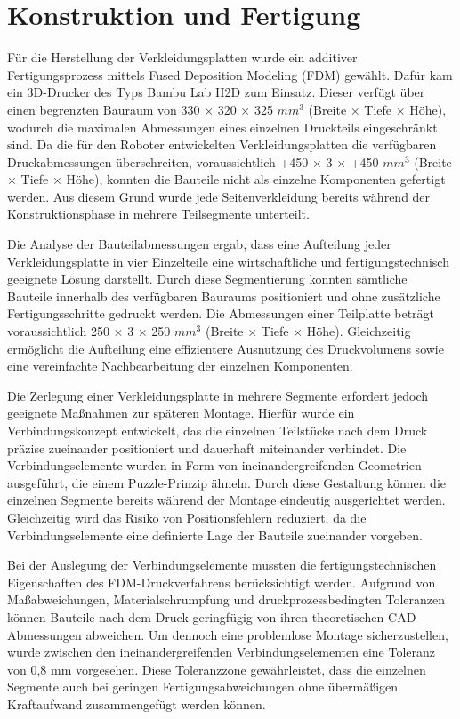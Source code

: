 \section{Konstruktion und Fertigung}

Für die Herstellung der Verkleidungsplatten wurde ein additiver Fertigungsprozess mittels Fused Deposition Modeling (FDM) gewählt. Dafür kam ein 3D-Drucker des Typs Bambu Lab H2D zum Einsatz. Dieser verfügt über einen begrenzten Bauraum von 330 × 320 × 325 $mm^3$ (Breite × Tiefe × Höhe), wodurch die maximalen Abmessungen eines einzelnen Druckteils eingeschränkt sind. Da die für den Roboter entwickelten Verkleidungsplatten die verfügbaren Druckabmessungen überschreiten, voraussichtlich +450 × 3 × +450 $mm^3$ (Breite × Tiefe × Höhe), konnten die Bauteile nicht als einzelne Komponenten gefertigt werden. Aus diesem Grund wurde jede Seitenverkleidung bereits während der Konstruktionsphase in mehrere Teilsegmente unterteilt.

Die Analyse der Bauteilabmessungen ergab, dass eine Aufteilung jeder Verkleidungsplatte in vier Einzelteile eine wirtschaftliche und fertigungstechnisch geeignete Lösung darstellt. Durch diese Segmentierung konnten sämtliche Bauteile innerhalb des verfügbaren Bauraums positioniert und ohne zusätzliche Fertigungsschritte gedruckt werden. Die Abmessungen einer Teilplatte beträgt voraussichtlich 250 × 3 × 250 $mm^3$ (Breite × Tiefe × Höhe). Gleichzeitig ermöglicht die Aufteilung eine effizientere Ausnutzung des Druckvolumens sowie eine vereinfachte Nachbearbeitung der einzelnen Komponenten.

Die Zerlegung einer Verkleidungsplatte in mehrere Segmente erfordert jedoch geeignete Maßnahmen zur späteren Montage. Hierfür wurde ein Verbindungskonzept entwickelt, das die einzelnen Teilstücke nach dem Druck präzise zueinander positioniert und dauerhaft miteinander verbindet. Die Verbindungselemente wurden in Form von ineinandergreifenden Geometrien ausgeführt, die einem Puzzle-Prinzip ähneln. Durch diese Gestaltung können die einzelnen Segmente bereits während der Montage eindeutig ausgerichtet werden. Gleichzeitig wird das Risiko von Positionsfehlern reduziert, da die Verbindungselemente eine definierte Lage der Bauteile zueinander vorgeben.

Bei der Auslegung der Verbindungselemente mussten die fertigungstechnischen Eigenschaften des FDM-Druckverfahrens berücksichtigt werden. Aufgrund von Maßabweichungen, Materialschrumpfung und druckprozessbedingten Toleranzen können Bauteile nach dem Druck geringfügig von ihren theoretischen CAD-Abmessungen abweichen. Um dennoch eine problemlose Montage sicherzustellen, wurde zwischen den ineinandergreifenden Verbindungselementen eine Toleranz von 0,8 mm vorgesehen. Diese Toleranzzone gewährleistet, dass die einzelnen Segmente auch bei geringen Fertigungsabweichungen ohne übermäßigen Kraftaufwand zusammengefügt werden können.


